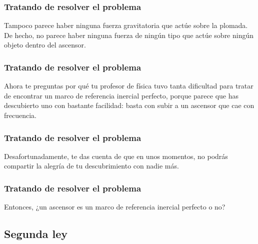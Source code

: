 \documentclass[12pt]{beamer}
\begin{document}
\begin{frame}
\frametitle{Tratando de resolver el problema}
Tampoco parece haber ninguna fuerza gravitatoria que actúe sobre la plomada.
\\
\bigskip
\pause
De hecho, no parece haber ninguna fuerza de ningún tipo que actúe sobre ningún objeto dentro del ascensor.
\end{frame}
\begin{frame}
\frametitle{Tratando de resolver el problema}
Ahora te preguntas por qué tu profesor de física tuvo tanta dificultad para tratar de encontrar un marco de referencia inercial perfecto, \pause porque parece que has descubierto uno con bastante facilidad: \pause basta con subir a un ascensor que cae con frecuencia.
\end{frame}
\begin{frame}
\frametitle{Tratando de resolver el problema}
Desafortunadamente, te das cuenta de que en unos momentos, no podrás compartir la alegría de tu descubrimiento con nadie más.
\end{frame}
\begin{frame}
\frametitle{Tratando de resolver el problema}
Entonces, \pause ¿un ascensor es un marco de referencia inercial perfecto o no?
\end{frame}

\subsection{Segunda ley}
\end{document}
